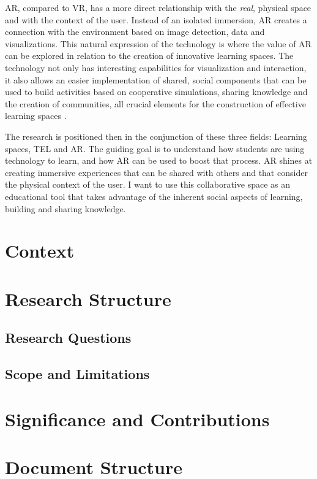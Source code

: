 \ac{AR}, compared to \ac{VR}, has a more direct relationship with the \emph{real}, physical space and with the context of the user.
Instead of an isolated immersion, \ac{AR} creates a connection with the environment based on image detection, data and visualizations.
This natural expression of the technology is where the value of \ac{AR} can be explored in relation to the creation of innovative
learning spaces. The technology not only has interesting capabilities for visualization and interaction, it also allows an easier
implementation of shared, social components that can be used to build activities based on cooperative simulations, sharing knowledge and
the creation of communities, all crucial elements for the construction of effective learning spaces \parencite{bligh_2017}.

The research is positioned then in the conjunction of these three fields: Learning spaces, \ac{TEL} and \ac{AR}. The guiding goal is to
understand how students are using technology to learn, and how \ac{AR} can be used to boost that process. \ac{AR} shines at creating
immersive experiences that can be shared with others and that consider the physical context of the user. I want to use this collaborative
space as an educational tool that takes advantage of the inherent social aspects of learning, building and sharing knowledge.

\section[Context]{Context}

\section[Research Structure]{Research Structure}
\subsection[Research Questions]{Research Questions}
\subsection[Scope and Limitations]{Scope and Limitations}
\section[Significance and Contributions]{Significance and Contributions}
\section[Document Structure]{Document Structure}